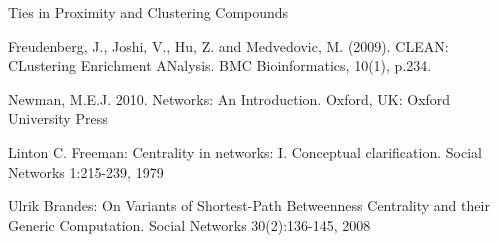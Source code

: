 \documentclass[9pt]{article}
\begin{document}
\begin{thebibliography}{8}
Ties in Proximity and Clustering Compounds

Freudenberg, J., Joshi, V., Hu, Z. and Medvedovic, M. (2009). CLEAN: CLustering Enrichment ANalysis. BMC Bioinformatics, 10(1), p.234.

Newman, M.E.J. 2010. Networks: An Introduction. Oxford, UK: Oxford University Press

Linton C. Freeman: Centrality in networks: I. Conceptual clarification. Social Networks 1:215-239, 1979

Ulrik Brandes: On Variants of Shortest-Path Betweenness Centrality and their Generic Computation. Social Networks 30(2):136-145, 2008
\end{thebibliography}
\end{document}
